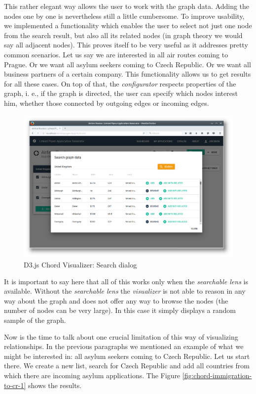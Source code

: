 This rather elegant way allows the user to work with the graph data. Adding the nodes one by one is nevertheless still a little cumbersome. To improve usability, we implemented a functionality which enables the user to select not just one node from the search result, but also all its related nodes (in graph theory we would say all adjacent nodes). This proves itself to be very useful as it addresses pretty common scenarios. Let us say we are interested in all air routes coming to Prague. Or we want all asylum seekers coming to Czech Republic. Or we want all business partners of a certain company. This functionality allows us to get results for all these cases. On top of that, the \emph{configurator} respects properties of the graph, i. e., if the graph is directed, the user can specify which nodes interest him, whether those connected by outgoing edges or incoming edges.

\begin{figure}
	\centering
	\includegraphics[width=145mm]{img/06_chord_search_dialog}
	\caption{D3.js Chord Visualizer: Search dialog}
    \label{fig:chord-search-dialog}
\end{figure}

It is important to say here that all of this works only when the \emph{searchable lens} is available. Without the \emph{searchable lens} the \emph{visualizer} is not able to reason in any way about the graph and does not offer any way to browse the nodes (the number of nodes can be very large). In this case it simply displays a random sample of the graph.

Now is the time to talk about one crucial limitation of this way of visualizing relationships. In the previous paragraphs we mentioned an example of what we might be interested in: all asylum seekers coming to Czech Republic. Let us start there. We create a new list, search for Czech Republic and add all countries from which there are incoming asylum applications. The Figure \ref{fig:chord-immigration-to-cr-1} shows the results.

